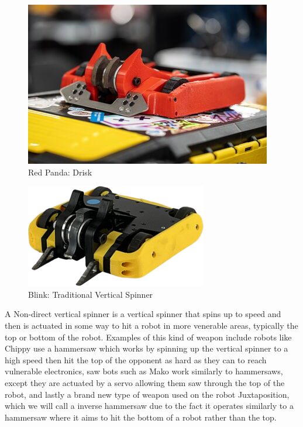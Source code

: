 \documentclass[conference]{IEEEtran}
\begin{document}
\begin{figure}[htp]
\centering
\includegraphics[scale=0.4]{redpanda.jpg}
\caption{Red Panda: Drisk \cite{b2}}
\label{Red Panda: Drisk}
\end{figure}

\begin{figure}[htp]
\centering
\includegraphics[scale=0.4]{blink.png}
\caption{Blink: Traditional Vertical Spinner \cite{b2}}
\label{Blink: Traditional Vertical Spinner}
\end{figure}

A Non-direct vertical spinner is a vertical spinner that spins up to speed and then is actuated in some way to hit a robot in more venerable areas, typically the top or bottom of the robot.  Examples of this kind of weapon include robots like Chippy use a hammersaw which works by spinning up the vertical spinner to a high speed then hit the top of the opponent as hard as they can to reach vulnerable electronics, saw bots such as Mako work similarly to hammersaws, except they are actuated by a servo allowing them saw through the top of the robot, and lastly a brand new type of weapon used on the robot Juxtaposition, which we will call a inverse hammersaw due to the fact it operates similarly to a hammersaw where it aims to hit the bottom of a robot rather than the top.
\end{document}
